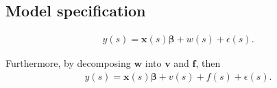 \documentclass[
12pt, %
a4paper, %
oneside, %
headinclude,footinclude, %
BCOR5mm, %
]{scrartcl}
\begin{document}
%


\subsection{\textcolor[rgb]{1.00,0.00,0.50}{Model specification}}
\begin{equation}
\begin{aligned}
  y(s) = \boldsymbol{x}(s)\boldsymbol{\beta} + w(s) + \epsilon(s).
\end{aligned} \label{model1}
\end{equation}

Furthermore, by decomposing $\boldsymbol{w}$ into $\boldsymbol{v}$ and $\boldsymbol{f}$, then 
\begin{equation}
\begin{aligned}
  y(s) = \boldsymbol{x}(s)\boldsymbol{\beta} + v(s) + f(s) + \epsilon(s).
\end{aligned} \label{DP1}
\end{equation}
\end{document}
